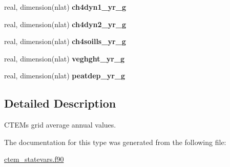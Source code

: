 \begin{DoxyCompactItemize}
\item 
\hypertarget{structctem__statevars_1_1ctem__gridavg__annual_a69697042dee989c18a02ac0b14fee186}{}real, dimension(nlat) {\bfseries ch4dyn1\+\_\+yr\+\_\+g}\label{structctem__statevars_1_1ctem__gridavg__annual_a69697042dee989c18a02ac0b14fee186}

\item 
\hypertarget{structctem__statevars_1_1ctem__gridavg__annual_aa2ac58833bdb7d9d9238161553e8cf07}{}real, dimension(nlat) {\bfseries ch4dyn2\+\_\+yr\+\_\+g}\label{structctem__statevars_1_1ctem__gridavg__annual_aa2ac58833bdb7d9d9238161553e8cf07}

\item 
\hypertarget{structctem__statevars_1_1ctem__gridavg__annual_a33b989a9f77e16ec0619b6e9c90eee7d}{}real, dimension(nlat) {\bfseries ch4soills\+\_\+yr\+\_\+g}\label{structctem__statevars_1_1ctem__gridavg__annual_a33b989a9f77e16ec0619b6e9c90eee7d}

\item 
\hypertarget{structctem__statevars_1_1ctem__gridavg__annual_a19c4180421b5b226f732ed93d96d29c5}{}real, dimension(nlat) {\bfseries veghght\+\_\+yr\+\_\+g}\label{structctem__statevars_1_1ctem__gridavg__annual_a19c4180421b5b226f732ed93d96d29c5}

\item 
\hypertarget{structctem__statevars_1_1ctem__gridavg__annual_aa0fde5c9a385f6fbc5248f29411dfbd1}{}real, dimension(nlat) {\bfseries peatdep\+\_\+yr\+\_\+g}\label{structctem__statevars_1_1ctem__gridavg__annual_aa0fde5c9a385f6fbc5248f29411dfbd1}

\end{DoxyCompactItemize}


\subsection{Detailed Description}
C\+T\+E\+M\textquotesingle{}s grid average annual values. 

The documentation for this type was generated from the following file\+:\begin{DoxyCompactItemize}
\item 
\hyperlink{ctem__statevars_8f90}{ctem\+\_\+statevars.\+f90}\end{DoxyCompactItemize}
